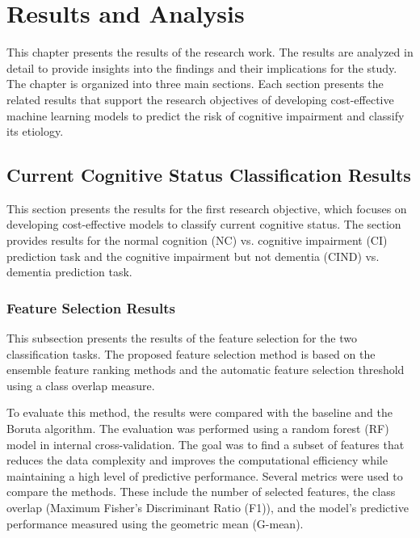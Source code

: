 \chapter{Results and Analysis}

\hspace{12.7mm}This chapter presents the results of the research work. The results are analyzed in detail to provide insights into the findings and their implications for the study. The chapter is organized into three main sections. Each section presents the related results that support the research objectives of developing cost-effective machine learning models to predict the risk of cognitive impairment and classify its etiology.

\section{Current Cognitive Status Classification Results}
This section presents the results for the first research objective, which focuses on developing cost-effective models to classify current cognitive status. The section provides results for the normal cognition (\acrshort{NC}) vs. cognitive impairment (\acrshort{CI}) prediction task and the cognitive impairment but not dementia (\acrshort{CIND}) vs. dementia prediction task.

\subsection{Feature Selection Results}

This subsection presents the results of the feature selection for the two classification tasks. The proposed feature selection method is based on the ensemble feature ranking methods and the automatic feature selection threshold using a class overlap measure. 

To evaluate this method, the results were compared with the baseline and the Boruta algorithm. The evaluation was performed using a random forest (\acrshort{RF}) model in internal cross-validation. The goal was to find a subset of features that reduces the data complexity and improves the computational efficiency while maintaining a high level of predictive performance. Several metrics were used to compare the methods. These include the number of selected features, the class overlap (Maximum Fisher's Discriminant Ratio (\acrshort{F1})), and the model's predictive performance measured using the geometric mean (\acrshort{G-mean}).

